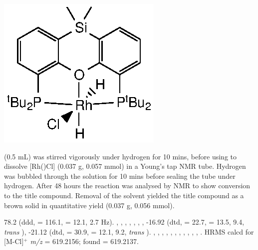 \begin{structure}[h]
\begin{center}
\includegraphics{../Structures/SitBuRhClH2.eps}
\end{center}
\end{structure}

 (0.5 mL) was stirred vigorously under hydrogen for 10 mins, before using to dissolve [Rh(\tBusixantphos)Cl] (0.037 g, 0.057 mmol) in a Young's tap NMR tube.  Hydrogen was bubbled through the solution for 10 mins before sealing the tube under hydrogen.  After 48 hours the reaction was analysed by NMR to show  conversion to the title compound.  Removal of the solvent  yielded the title compound as a brown solid in quantitative yield (0.037 g, 0.056 mmol).  

78.2 (ddd, \JRhP{} = 116.1, \JPH{} = 12.1, 2.7 Hz).
,
,
,
,
,
,
,
-16.92 (dtd, \JRhH{} = 22.7, \JPH{} = 13.5, \JHH{} 9.4,  \emph{trans} ),
-21.12 (dtd, \JRhH{} = 30.9, \JPH{} = 12.1, \JHH{} 9.2,  \emph{trans} ).
,
,
,
,
,
,
,
,
,
,
,
.
HRMS calcd for  [M-Cl]$^+$ \emph{m/z} = 619.2156; found = 619.2137.


